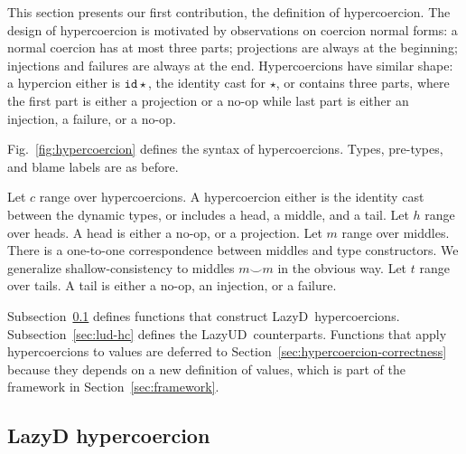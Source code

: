 \documentclass[acmsmall,review,anonymous]{acmart}\settopmatter{printfolios=true,printccs=false,printacmref=false}
\newcommand{\figref}[1]{Fig.~\ref{#1}}
\newcommand{\lazyUD}{Lazy\;UD}
\newcommand{\lazyD}{Lazy\;D}
\newcommand{\TOOdyn}[0]{\star}
\newcommand{\hyperCoercionI}[0]{\mathtt{id\star}}
\begin{document}
This section presents our first contribution, the definition of hypercoercion. 
The design of hypercoercion is motivated by observations on coercion normal 
forms: a normal coercion has at most three parts; projections are always at the 
beginning; injections and failures are always at the end. Hypercoercions have 
similar shape: a hypercion either is $\hyperCoercionI$, the identity cast for 
$\TOOdyn$, or contains three parts, where the first part is either a 
projection or a no-op while last part is either an injection, a failure, or a 
no-op.

\figref{fig:hypercoercion} defines the syntax of hypercoercions. Types, 
pre-types, and blame labels are as before.

Let $c$ range over hypercoercions. A hypercoercion either is the identity 
cast between the dynamic types, or includes a head, a middle, and a tail. 
Let $h$ range over heads. A head is either a no-op, or a projection.
Let $m$ range over middles. There is a one-to-one 
correspondence between middles and type constructors. 
We generalize shallow-consistency to middles $m \smile m$ in the obvious way.
Let $t$ range over tails. A tail is either a no-op, an injection, or a 
failure.

Subsection~\ref{sec:ld-hc} defines functions that construct \lazyD\ 
hypercoercions. Subsection~\ref{sec:lud-hc} defines the \lazyUD\ counterparts. 
Functions that apply hypercoercions to values are deferred to 
Section~\ref{sec:hypercoercion-correctness} because they depends on a new 
definition of values, which is part of the framework in
Section~\ref{sec:framework}.

\subsection{\lazyD{} hypercoercion}
\label{sec:ld-hc}
\end{document}
